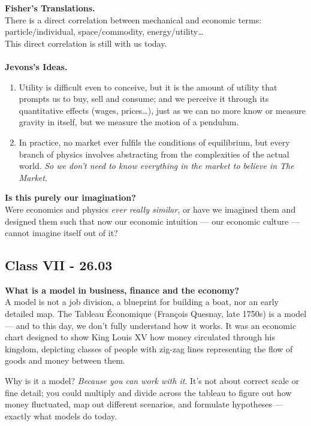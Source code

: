 \documentclass[a4paper,12pt]{article}
\begin{document}
\noindent \textbf{Fisher's Translations.} \\
\noindent There is a direct correlation between mechanical and economic terms: particle/individual, space/commodity, energy/utility\dots \\
\noindent This direct correlation is still with us today. \\
\\
\noindent \textbf{Jevons's Ideas.}
\begin{enumerate}
	\item Utility is difficult even to conceive, but it is the amount of utility that prompts us to buy, sell and consume; and we perceive it through its quantitative effects (wages, prices\dots), just as we can no more know or measure gravity in itself, but we measure the motion of a pendulum.
	\item In practice, no market ever fulfils the conditions of equilibrium, but every branch of physics involves abstracting from the complexities of the actual world. \emph{So we don't need to know everything in the market to believe in The Market}.
\end{enumerate}
\noindent \textbf{Is this purely our imagination?} \\
\noindent Were economics and physics \emph{ever really similar}, or have we imagined them and designed them such that now our economic intuition --- our economic culture --- cannot imagine itself out of it?
\subsection*{Class VII - 26.03}
\noindent \textbf{What is a model in business, finance and the economy?} \\
\noindent A model is not a job division, a blueprint for building a boat, nor an early detailed map. The Tableau Économique (François Quesnay, late 1750s) is a model --- and to this day, we don't fully understand how it works. It was an economic chart designed to show King Louis XV how money circulated through his kingdom, depicting classes of people with zig-zag lines representing the flow of goods and money between them.

Why is it a model? \emph{Because you can work with it}. It's not about correct scale or fine detail; you could multiply and divide across the tableau to figure out how money fluctuated, map out different scenarios, and formulate hypotheses --- exactly what models do today. \\
\end{document}
